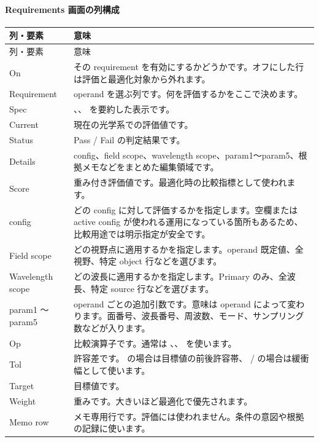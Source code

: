 \documentclass[11pt]{article}
\newcommand{\code}[1]{\texttt{\detokenize{#1}}}
\begin{document}
\paragraph{Requirements 画面の列構成}
\begin{center}
\small
\begin{longtable}{p{2.4cm} p{11.0cm}}
\toprule
列・要素 & 意味 \\
\midrule
\endfirsthead
\toprule
列・要素 & 意味 \\
\midrule
\endhead
On & その requirement を有効にするかどうかです。オフにした行は評価と最適化対象から外れます。 \\
Requirement & operand を選ぶ列です。何を評価するかをここで決めます。 \\
Spec & \code{op}、\code{target}、\code{tol} を要約した表示です。 \\
Current & 現在の光学系での評価値です。 \\
Status & Pass / Fail の判定結果です。 \\
Details & config、field scope、wavelength scope、param1〜param5、根拠メモなどをまとめた編集領域です。 \\
Score & 重み付き評価値です。最適化時の比較指標として使われます。 \\
config & どの config に対して評価するかを指定します。空欄または active config が使われる運用になっている箇所もあるため、比較用途では明示指定が安全です。 \\
Field scope & どの視野点に適用するかを指定します。operand 既定値、全視野、特定 object 行などを選びます。 \\
Wavelength scope & どの波長に適用するかを指定します。Primary のみ、全波長、特定 source 行などを選びます。 \\
param1 〜 param5 & operand ごとの追加引数です。意味は operand によって変わります。面番号、波長番号、周波数、モード、サンプリング数などが入ります。 \\
Op & 比較演算子です。通常は \code{=}、\code{<=}、\code{>=} を使います。 \\
Tol & 許容差です。\code{=} の場合は目標値の前後許容帯、\code{<=} / \code{>=} の場合は緩衝幅として使います。 \\
Target & 目標値です。 \\
Weight & 重みです。大きいほど最適化で優先されます。 \\
Memo row & メモ専用行です。評価には使われません。条件の意図や根拠の記録に使います。 \\
\bottomrule
\end{longtable}
\normalsize
\end{center}
\end{document}
